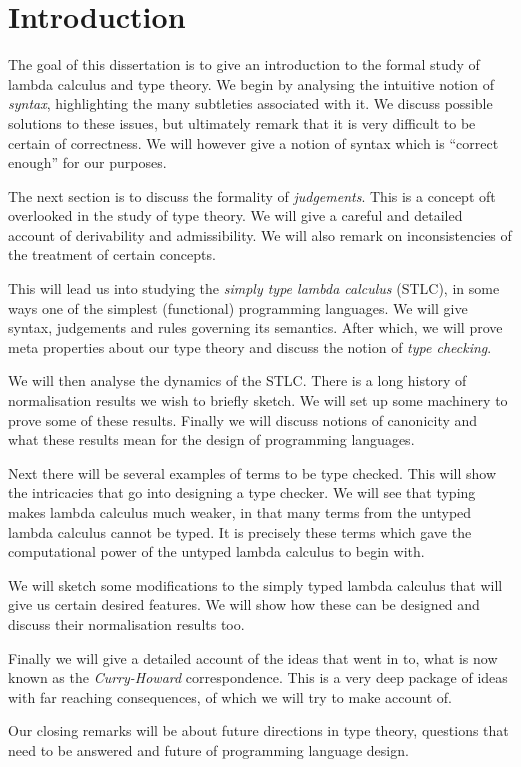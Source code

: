 \section{Introduction}

The goal of this dissertation is to give an introduction to the formal study of lambda calculus and type theory. We begin by analysing the intuitive notion of \emph{syntax}, highlighting the many subtleties associated with it. We discuss possible solutions to these issues, but ultimately remark that it is very difficult to be certain of correctness. We will however give a notion of syntax which is ``correct enough'' for our purposes.

The next section is to discuss the formality of \emph{judgements}. This is a concept oft overlooked in the study of type theory. We will give a careful and detailed account of derivability and admissibility. We will also remark on inconsistencies of the treatment of certain concepts.

This will lead us into studying the \emph{simply type lambda calculus} (STLC), in some ways one of the simplest (functional) programming languages. We will give syntax, judgements and rules governing its semantics. After which, we will prove meta properties about our type theory and discuss the notion of \emph{type checking}.

We will then analyse the dynamics of the STLC. There is a long history of normalisation results we wish to briefly sketch. We will set up some machinery to prove some of these results. Finally we will discuss notions of canonicity and what these results mean for the design of programming languages.

Next there will be several examples of terms to be type checked. This will show the intricacies that go into designing a type checker. We will see that typing makes lambda calculus much weaker, in that many terms from the untyped lambda calculus cannot be typed. It is precisely these terms which gave the computational power of the untyped lambda calculus to begin with.

We will sketch some modifications to the simply typed lambda calculus that will give us certain desired features. We will show how these can be designed and discuss their normalisation results too.

Finally we will give a detailed account of the ideas that went in to, what is now known as the \emph{Curry-Howard} correspondence. This is a very deep package of ideas with far reaching consequences, of which we will try to make account of.

Our closing remarks will be about future directions in type theory, questions that need to be answered and future of programming language design.

